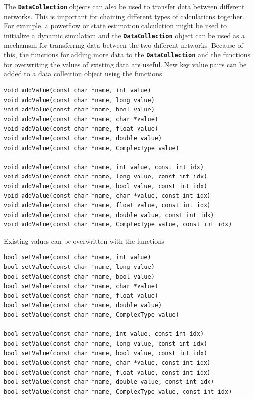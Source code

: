 \documentclass[12pt]{report} %
\begin{document}
The \texttt{\textbf{DataCollection}} objects can also be used to transfer data between different networks. This is important for chaining different types of calculations together. For example, a powerflow or state estimation calculation might be used to initialize a dynamic simulation and the \texttt{\textbf{DataCollection}} object can be used as a mechanism for transferring data between the two different networks. Because of this, the functions for adding more data to the \texttt{\textbf{DataCollection}} and the functions for overwriting the values of existing data are useful. New key value pairs can be added to a data collection object using the functions

{
\color{red}
\begin{Verbatim}[fontseries=b]
void addValue(const char *name, int value)
void addValue(const char *name, long value)
void addValue(const char *name, bool value)
void addValue(const char *name, char *value)
void addValue(const char *name, float value)
void addValue(const char *name, double value)
void addValue(const char *name, ComplexType value)

void addValue(const char *name, int value, const int idx)
void addValue(const char *name, long value, const int idx)
void addValue(const char *name, bool value, const int idx)
void addValue(const char *name, char *value, const int idx)
void addValue(const char *name, float value, const int idx)
void addValue(const char *name, double value, const int idx)
void addValue(const char *name, ComplexType value, const int idx)
\end{Verbatim}
}

Existing values can be overwritten with the functions

{
\color{red}
\begin{Verbatim}[fontseries=b]
bool setValue(const char *name, int value)
bool setValue(const char *name, long value)
bool setValue(const char *name, bool value)
bool setValue(const char *name, char *value)
bool setValue(const char *name, float value)
bool setValue(const char *name, double value)
bool setValue(const char *name, ComplexType value)

bool setValue(const char *name, int value, const int idx)
bool setValue(const char *name, long value, const int idx)
bool setValue(const char *name, bool value, const int idx)
bool setValue(const char *name, char *value, const int idx)
bool setValue(const char *name, float value, const int idx)
bool setValue(const char *name, double value, const int idx)
bool setValue(const char *name, ComplexType value, const int idx)
\end{Verbatim}
}
\end{document}

